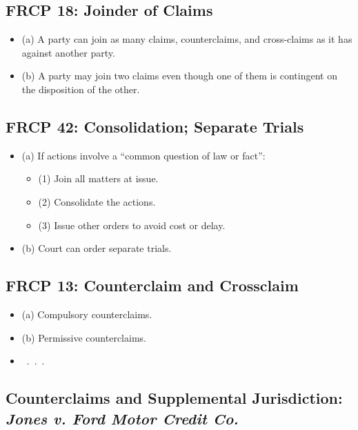 \subsection{FRCP 18: Joinder of Claims}

\begin{itemize}
    \item (a) A party can join as many claims, counterclaims, and cross-claims 
    as it has against another party.
    \item (b) A party may join two claims even though one of them is 
    contingent on the disposition of the other.
\end{itemize}

\subsection{FRCP 42: Consolidation; Separate Trials}

\begin{itemize}
    \item (a) If actions involve a ``common question of law or fact'':
    \begin{itemize}
        \item (1) Join all matters at issue.
        \item (2) Consolidate the actions.
        \item (3) Issue other orders to avoid cost or delay.
    \end{itemize}
    \item (b) Court can order separate trials.
\end{itemize}

\subsection{FRCP 13: Counterclaim and Crossclaim}

\begin{itemize}
    \item (a) Compulsory counterclaims.
    \item (b) Permissive counterclaims.
    \item ~.~.~.~
\end{itemize}

\subsection{Counterclaims and Supplemental Jurisdiction: \emph{Jones v. Ford 
Motor Credit Co.}}

